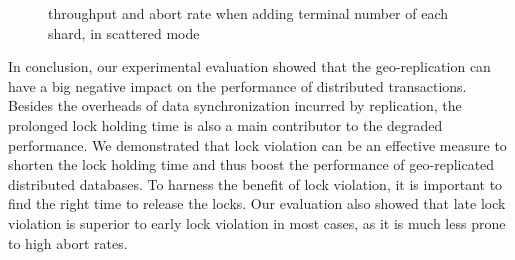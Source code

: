 \documentclass[conference]{IEEEtran}
\begin{document}
\begin{figure}[htbp]
  \centering

\caption{throughput and abort rate when adding terminal number of each shard, in scattered mode}
\label{fig:new_order_add_terminal_scattered}
\end{figure}

In conclusion, our experimental evaluation showed that the geo-replication can have a big negative impact on the performance of distributed transactions.
Besides the overheads of data synchronization incurred by replication, the prolonged lock holding time is also a main contributor to the degraded performance.
We demonstrated that lock violation can be an effective measure to shorten the lock holding time and thus boost the performance of geo-replicated distributed databases.
To harness the benefit of lock violation, it is important to find the right time to release the locks.
Our evaluation also showed that late lock violation is superior to early lock violation in most cases, as it is much less prone to high abort rates.
\end{document}
